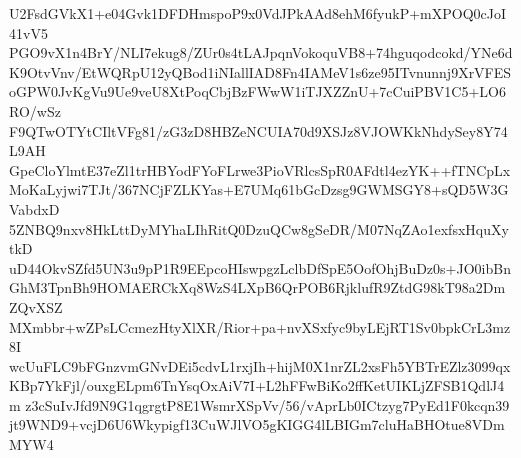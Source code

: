 U2FsdGVkX1+e04Gvk1DFDHmspoP9x0VdJPkAAd8ehM6fyukP+mXPOQ0cJoI41vV5
PGO9vX1n4BrY/NLI7ekug8/ZUr0s4tLAJpqnVokoquVB8+74hguqodcokd/YNe6d
K9OtvVnv/EtWQRpU12yQBod1iNIallIAD8Fn4IAMeV1s6ze95ITvnunnj9XrVFES
oGPW0JvKgVu9Ue9veU8XtPoqCbjBzFWwW1iTJXZZnU+7cCuiPBV1C5+LO6RO/wSz
F9QTwOTYtCIltVFg81/zG3zD8HBZeNCUIA70d9XSJz8VJOWKkNhdySey8Y74L9AH
GpeCloYlmtE37eZl1trHBYodFYoFLrwe3PioVRlcsSpR0AFdtl4ezYK++fTNCpLx
MoKaLyjwi7TJt/367NCjFZLKYas+E7UMq61bGcDzsg9GWMSGY8+sQD5W3GVabdxD
5ZNBQ9nxv8HkLttDyMYhaLIhRitQ0DzuQCw8gSeDR/M07NqZAo1exfsxHquXytkD
uD44OkvSZfd5UN3u9pP1R9EEpcoHIswpgzLclbDfSpE5OofOhjBuDz0s+JO0ibBn
GhM3TpnBh9HOMAERCkXq8WzS4LXpB6QrPOB6RjklufR9ZtdG98kT98a2DmZQvXSZ
MXmbbr+wZPsLCcmezHtyXlXR/Rior+pa+nvXSxfyc9byLEjRT1Sv0bpkCrL3mz8I
wcUuFLC9bFGnzvmGNvDEi5cdvL1rxjIh+hijM0X1nrZL2xsFh5YBTrEZlz3099qx
KBp7YkFjl/ouxgELpm6TnYsqOxAiV7I+L2hFFwBiKo2ffKetUIKLjZFSB1QdlJ4m
z3cSuIvJfd9N9G1qgrgtP8E1WsmrXSpVv/56/vAprLb0ICtzyg7PyEd1F0kcqn39
jt9WND9+vcjD6U6Wkypigf13CuWJlVO5gKIGG4lLBIGm7cluHaBHOtue8VDmMYW4
